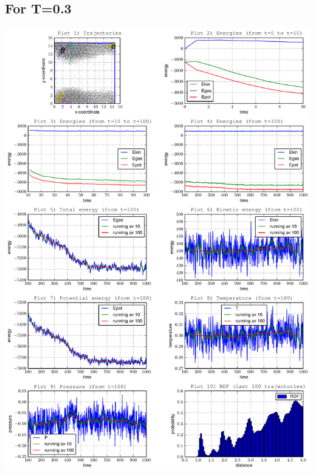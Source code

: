 \documentclass[12pt,a4paper]{scrartcl}
\begin{document}
\subsection*{For T=0.3}
\includegraphics[page=1, scale=0.6]{../plots/all03}
\end{document}

